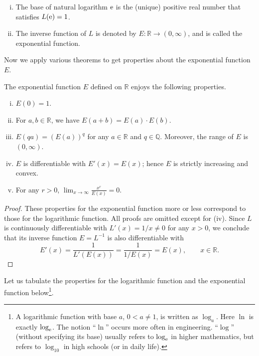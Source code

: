 \begin{defn}
  \begin{enumerate}[(i)]
    \item The \textsf{base of natural logarithm} $\mathrm e$ is the (unique) positive real number that satisfies $L(\mathrm e) = 1$.
    \item The inverse function of $L$ is denoted by $E: \mathbb{R} \to (0,\infty)$, and is called the \textsf{exponential function}.
  \end{enumerate}
\end{defn}

Now we apply various theorems to get properties about the exponential function $E$.

\begin{thm}
  The exponential function $E$ defined on $\mathbb{R}$ enjoys the following properties.
  \begin{enumerate}[(i)]
    \item $E(0) = 1$.

    \item For $a, b \in \mathbb{R}$, we have $E(a+b) = E(a) \cdot E(b)$.

    \item $E(qa) = (E(a))^q$ for any $a \in \mathbb{R}$ and $q \in \mathbb{Q}$.  Moreover, the range of $E$ is $(0,\infty)$.

    \item $E$ is differentiable with $E'(x) = E(x)$; hence $E$ is strictly increasing and convex.

    \item For any $r > 0$, $\displaystyle \lim_{x \to \infty} \frac{x^r}{E(x)} = 0$.
  \end{enumerate}
\end{thm}

\begin{proof}
  These properties for the exponential function more or less correspond to those for the logarithmic function.
  All proofs are omitted except for (iv).
  Since $L$ is continuously differentiable with $L'(x) = 1/x \ne 0$ for any $x > 0$, we conclude that its inverse function $E = L^{-1}$ is also differentiable with
  \[
    E'(x) = \frac{1}{L'(E(x))} = \frac{1}{1/E(x)} = E(x), \qquad x \in \mathbb{R}.
  \]
\end{proof}

Let us tabulate the properties for the logarithmic function and the exponential function below\footnote{%
A logarithmic function with base $a$, $0 < a \ne 1$, is written as $\log_a$.
Here $\ln$ is exactly $\log_{\mathrm e}$.
The notion ``$\ln$'' occurs more often in engineering.
``$\log$'' (without specifying its base) usually refers to $\log_{\mathrm e}$ in higher mathematics, but refers to $\log_{10}$ in high schools (or in daily life).
}.

